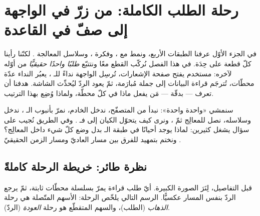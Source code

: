 \section{رحلة الطلب الكاملة: من زرّ في الواجهة إلى صفّ في القاعدة}

في الجزء الأوّل عرفنا الطبقات الأربع، ونمط  مع ،
وفكرة ، وسلاسل المعالجة .
لكنّنا رأينا كلّ قطعة على حِدَة. في هذا الفصل نُركّب القطع معًا ونتتبّع
\emph{طلبًا واحدًا حقيقيًّا} من أوّله لآخره: مستخدم يفتح صفحة الإشعارات، تُرسِل
الواجهة نداءً للـ ، يعبُر النداء عدّة محطّات، تُترجَم قراءة البيانات إلى
جملة  مُبارَمة، ثمّ يعود الردّ ليُحدِّث الشاشة. هدفنا أن تعرف — بدقّة —
مَن يفعل ماذا في كلّ محطّة، ولماذا وُضِع بهذا الترتيب.

سنمشي «واحدة واحدة»: نبدأ من المتصفّح، ندخل الخادم، نمرّ بأنبوب الـ ،
ندخل  وسلاسله، نصل للمعالِج ثمّ ، ونرى كيف يتحوّل الكيان إلى
 فـ . وفي الطريق نُجيب على سؤال يشغل كثيرين: لماذا يوجد أحيانًا
 في طبقة الـ  بدل وضع كلّ شيء داخل المعالِج؟ ونختم
بتمهيد للفرق بين مسار  العاديّ ومسار الزمن الحقيقيّ .

\subsection{نظرة طائر: خريطة الرحلة كاملةً}

قبل التفاصيل، لِنَرَ الصورة الكبيرة. أيّ طلب قراءة يمرّ بسلسلة محطّات ثابتة، ثمّ
يرجع الردّ بنفس المسار عكسيًّا. الرسم التالي يلخّص الرحلة: الأسهم المتّصلة هي رحلة
\emph{الذهاب} (الطلب)، والسهم المتقطّع هو رحلة \emph{العودة} (الردّ).

\begin{center}\begin{LTR}
\end{LTR}\end{center}

